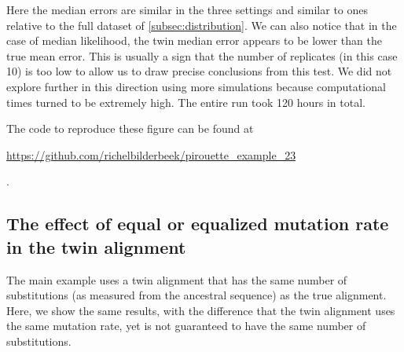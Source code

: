 Here the median errors are similar in the three settings and similar to 
ones relative to the full dataset of \ref{subsec:distribution}. We can also 
notice that in the case of median likelihood, the twin median error appears 
to be lower than the true mean error. This is usually a sign that the number 
of replicates (in this case 10) is too low to allow us to draw precise 
conclusions from this test. We did not explore further in this 
direction using more simulations because computational times turned to be 
extremely high. 
The entire run took 120 hours in total.

The code to reproduce these figure can be found at  
\begin{sloppypar}
  \url{https://github.com/richelbilderbeek/pirouette_example_23}
\end{sloppypar}.

\newpage

\subsection{The effect of equal or equalized mutation rate in the twin alignment}
\label{subsec:different_n_mutations}
  
The main example uses a twin alignment that has the same number
of substitutions (as measured from the ancestral sequence) as the true alignment. Here, we show the same results, with the difference that
the twin alignment uses the same mutation rate, yet is not guaranteed
to have the same number of substitutions.

